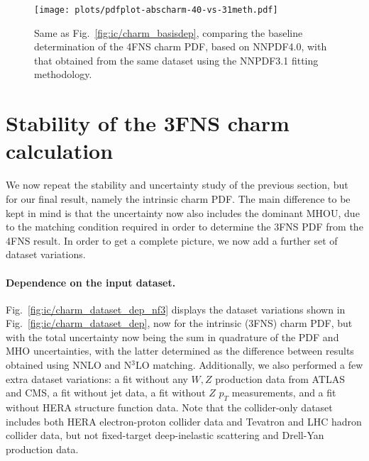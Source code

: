 \begin{figure}[t]
  \begin{center}
    \texttt{[image: plots/pdfplot-abscharm-40-vs-31meth.pdf]}
    \caption{\small Same as Fig.~\ref{fig:ic/charm_basisdep}, comparing
      the baseline determination of the 4FNS charm PDF, based
      on NNPDF4.0, with that obtained
      from the same dataset using the NNPDF3.1 fitting methodology.
  \label{fig:ic/pdfplot-abscharm-40-vs-31meth} }
\end{center}
\end{figure}



\clearpage
\section{Stability of the 3FNS charm calculation}
\label{app:ic/charm_stability_3fns}

We now repeat the stability and uncertainty
study of the previous section, but for our final
result, namely the intrinsic charm PDF. The main difference to be kept
in mind is that the uncertainty now also includes the dominant MHOU,
due to the matching condition required in order to determine the 3FNS
PDF from the 4FNS result. In order to get a complete picture, we now
add a further set of dataset variations.

\paragraph{Dependence on the input dataset.}
%
Fig.~\ref{fig:ic/charm_dataset_dep_nf3} displays the dataset variations shown in
Fig.~\ref{fig:ic/charm_dataset_dep}, now for the intrinsic (3FNS) charm
PDF, but with the total uncertainty now being the sum in quadrature of
the PDF and MHO uncertainties, with the latter determined as the difference between
results obtained using NNLO and N$^3$LO matching.
%
Additionally, we also performed a few extra  dataset
variations: a fit without any $W, Z$ production data from ATLAS and CMS,
a fit without jet data, a fit without $Z$ $p_T$ measurements, and a fit without
HERA structure function data.
%
Note that the collider-only dataset includes both HERA electron-proton
collider data and Tevatron and LHC hadron collider data, but not
fixed-target deep-inelastic scattering and Drell-Yan production data.


